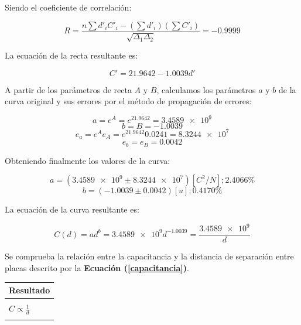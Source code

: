 \documentclass[letter,11pt]{article}
\begin{document}
Siendo el coeficiente de correlación:

\begin{equation*}
    R = \frac{n \sum d'_i C'_i - (\sum d'_i)(\sum C'_i)}{\sqrt{\Delta_1 \Delta_2}} = -0.9999
\end{equation*}

La ecuación de la recta resultante es:

\begin{equation*}
    C' = 21.9642 - 1.0039 d'
\end{equation*}

A partir de los parámetros de recta $A$ y $B$, calculamos los parámetros $a$ y
$b$ de la curva original y sus errores por el método de propagación de errores:

\begin{equation*}
    a = e^{A} = e^{21.9642} = \num{3.4589e9}
\end{equation*}
\begin{equation*}
    b = B = -1.0039
\end{equation*}
\begin{equation*}
    e_a = e^A e_A = e^{21.9642} \num{0.0241} = \num{8.3244e7}
\end{equation*}
\begin{equation*}
    e_b = e_B = 0.0042
\end{equation*}

Obteniendo finalmente los valores de la curva:

\begin{equation*}
    a = (\num{3.4589e9} \pm \num{8.3244e7})[C^2/N]; 2.4066\%
\end{equation*}
\begin{equation*}
    b = (-1.0039 \pm 0.0042)[u]; 0.4170\%
\end{equation*}

La ecuación de la curva resultante es:

\begin{equation}
    C(d) = a d^b = \num{3.4589e9} d^{-1.0039} = \frac{\num{3.4589e9}}{d}
\label{curva}
\end{equation}

Se comprueba la relación entre la capacitancia y la distancia de separación
entre placas descrito por la \textbf{Ecuación (\ref{capacitancia})}.

\begin{center}
\begin{tabular}{|>{\centering}m{9.2cm}<{\centering}|}
\hline
\textbf{Resultado} 
\tabularnewline \hline
\\
\Large{$C \propto \frac{1}{d}$} \tabularnewline
\\
\hline
\end{tabular}
\end{center}
\end{document}
